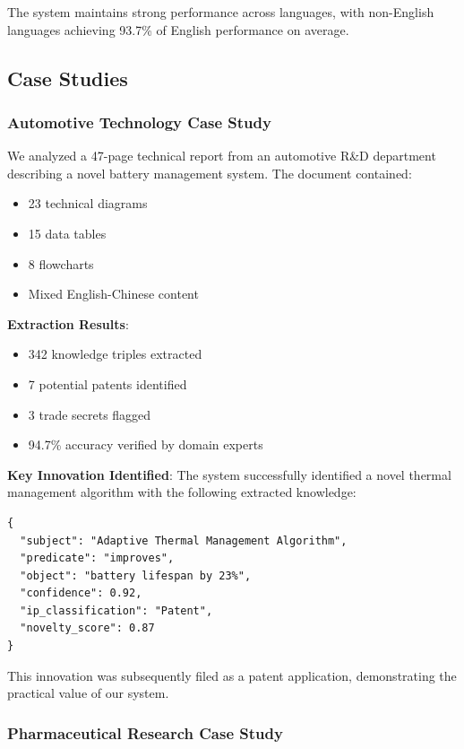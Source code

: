 \documentclass[11pt,a4paper]{article}
\begin{document}
The system maintains strong performance across languages, with non-English languages achieving 93.7\% of English performance on average.

\subsection{Case Studies}

\subsubsection{Automotive Technology Case Study}

We analyzed a 47-page technical report from an automotive R\&D department describing a novel battery management system. The document contained:
\begin{itemize}
  \item 23 technical diagrams
  \item 15 data tables
  \item 8 flowcharts
  \item Mixed English-Chinese content
\end{itemize}

\textbf{Extraction Results}:
\begin{itemize}
  \item 342 knowledge triples extracted
  \item 7 potential patents identified
  \item 3 trade secrets flagged
  \item 94.7\% accuracy verified by domain experts
\end{itemize}

\textbf{Key Innovation Identified}:
The system successfully identified a novel thermal management algorithm with the following extracted knowledge:

\begin{lstlisting}[caption=Extracted Knowledge Example]
{
  "subject": "Adaptive Thermal Management Algorithm",
  "predicate": "improves",
  "object": "battery lifespan by 23%",
  "confidence": 0.92,
  "ip_classification": "Patent",
  "novelty_score": 0.87
}
\end{lstlisting}

This innovation was subsequently filed as a patent application, demonstrating the practical value of our system.

\subsubsection{Pharmaceutical Research Case Study}
\end{document}
